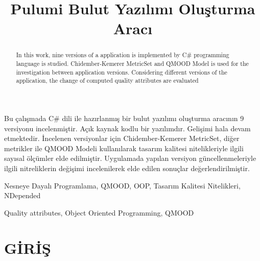 \documentclass[conference]{IEEEtran}
\begin{document}

%
\title{Pulumi Bulut Yazılımı Oluşturma Aracı}
\author{
}

\maketitle
\begin{ozet}
Bu çalışmada C\# dili ile hazırlanmış bir bulut yazılımı oluşturma aracının 9 versiyonu incelenmiştir. Açık kaynak kodlu bir yazılımdır. Gelişimi hala devam etmektedir. İncelenen versiyonlar için Chidember-Kemerer MetricSet, diğer metrikler ile QMOOD Modeli kullanılarak tasarım kalitesi nitelikleriyle ilgili sayısal ölçümler elde edilmiştir. Uygulamada yapılan versiyon güncellenmeleriyle ilgili nitreliklerin değişimi incelenilerek elde edilen sonuçlar değerlendirilmiştir. 
\end{ozet}
\begin{IEEEanahtar}
Nesneye Dayalı Programlama, QMOOD, OOP, Tasarım Kalitesi Nitelikleri, NDepended
\end{IEEEanahtar}
\begin{abstract}
In this work, nine versions of a  application  is implemented by C# programming language is studied. Chidember-Kemerer MetricSet and QMOOD Model is used for the investigation between application versions. Considering different versions of the application, the change of computed quality attributes are evaluated
\end{abstract}
\begin{IEEEkeywords}
Quality attributes, Object Oriented Programming, QMOOD
\end{IEEEkeywords}
\IEEEpeerreviewmaketitle

\IEEEpubidadjcol


\section{GİRİŞ}
\end{document}
